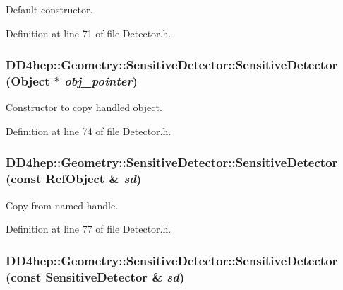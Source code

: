 Default constructor. 

Definition at line 71 of file Detector.h.\hypertarget{class_d_d4hep_1_1_geometry_1_1_sensitive_detector_a52024ca16cb8a4a3d81802ba224efbe3}{
\subsubsection[{SensitiveDetector}]{\setlength{\rightskip}{0pt plus 5cm}DD4hep::Geometry::SensitiveDetector::SensitiveDetector ({\bf Object} $\ast$ {\em obj\_\-pointer})}}
\label{class_d_d4hep_1_1_geometry_1_1_sensitive_detector_a52024ca16cb8a4a3d81802ba224efbe3}


Constructor to copy handled object. 

Definition at line 74 of file Detector.h.\hypertarget{class_d_d4hep_1_1_geometry_1_1_sensitive_detector_a6cdd000bbf0d6712cdf5348a4d909198}{
\subsubsection[{SensitiveDetector}]{\setlength{\rightskip}{0pt plus 5cm}DD4hep::Geometry::SensitiveDetector::SensitiveDetector (const {\bf RefObject} \& {\em sd})}}
\label{class_d_d4hep_1_1_geometry_1_1_sensitive_detector_a6cdd000bbf0d6712cdf5348a4d909198}


Copy from named handle. 

Definition at line 77 of file Detector.h.\hypertarget{class_d_d4hep_1_1_geometry_1_1_sensitive_detector_a70d28c0848133d4a915dc23c46afb7bf}{
\subsubsection[{SensitiveDetector}]{\setlength{\rightskip}{0pt plus 5cm}DD4hep::Geometry::SensitiveDetector::SensitiveDetector (const {\bf SensitiveDetector} \& {\em sd})}}
\label{class_d_d4hep_1_1_geometry_1_1_sensitive_detector_a70d28c0848133d4a915dc23c46afb7bf}


